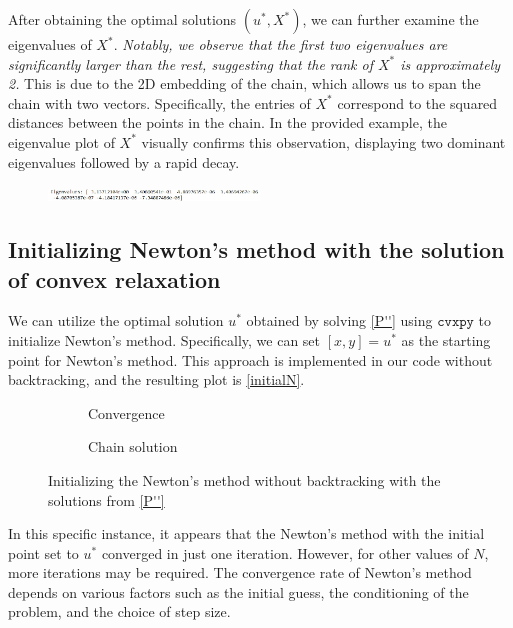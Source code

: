 \documentclass[10pt,a4paper,notitlepage,twocolumn]{article}
\begin{document}
After obtaining the optimal solutions $(u^*, X^*)$, we can further examine the eigenvalues of $X^*$. \textit{Notably, we observe that the first two eigenvalues are significantly larger than the rest, suggesting that the rank of $X^*$ is approximately 2.} This is due to the 2D embedding of the chain, which allows us to span the chain with two vectors. Specifically, the entries of $X^*$ correspond to the squared distances between the points in the chain. In the provided example, the eigenvalue plot of $X^*$ visually confirms this observation, displaying two dominant eigenvalues followed by a rapid decay.

\begin{figure}[H]
    \centering
    \includegraphics[width=0.5\textwidth]{Eigenvalues.jpg}
\end{figure}

\subsection{Initializing Newton's method with the solution of convex relaxation}

We can utilize the optimal solution $u^*$ obtained by solving \eqref{P''} using $\mathtt{cvxpy}$ to initialize Newton's method. Specifically, we can set $[x,y] = u^*$ as the starting point for Newton's method. This approach is implemented in our code without backtracking, and the resulting plot is \autoref{initialN}.

\begin{figure}[htbp]
    \centering
    \begin{subfigure}[b]{0.4\textwidth}
    
    \caption{Convergence}
    \end{subfigure}
    \hfill
    \begin{subfigure}[b]{0.4\textwidth}  
    
    \caption{Chain solution}
    \end{subfigure}
    \caption{Initializing the Newton's method without backtracking with the solutions from \eqref{P''}}
    \label{initialN}
\end{figure}

In this specific instance, it appears that the Newton's method with the initial point set to $u^*$ converged in just one iteration. However, for other values of $N$, more iterations may be required. The convergence rate of Newton's method depends on various factors such as the initial guess, the conditioning of the problem, and the choice of step size.
\end{document}
